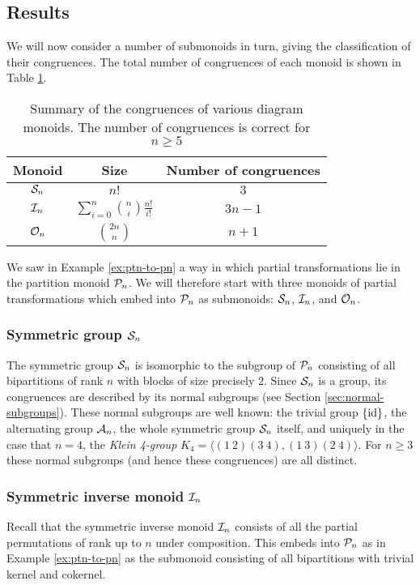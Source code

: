 \subsection{Results}
\label{sec:other-monoids-results}
We will now consider a number of submonoids in turn, giving the classification
of their congruences.  The total number of congruences of each monoid is shown
in Table \ref{tab:other-monoids}.

\begin{table}[h]
  \centering
  \renewcommand\arraystretch{1.5}
  \begin{tabular}{| c | c | c |}
    \hline
    Monoid & Size & Number of congruences \\
    \hline
    $\mathcal{S}_n$ & $n!$ & $3$ \\
    $\mathcal{I}_n$ & $\sum_{i=0}^n \binom{n}{i} \frac{n!}{i!}$ & $3n - 1$ \\
    $\mathcal{O}_n$ & $\binom{2n}{n}$ & $n + 1$ \\
    \hline
  \end{tabular}
  \caption{Summary of the congruences of various diagram monoids.  The number of
  congruences is correct for $n \geq 5$}
  \label{tab:other-monoids}
\end{table}

We saw in Example \ref{ex:ptn-to-pn} a way in which partial transformations lie
in the partition monoid $\mathcal{P}_n$.  We will therefore start with three monoids of
partial transformations which embed into $\mathcal{P}_n$ as submonoids: $\mathcal{S}_n$,
$\mathcal{I}_n$, and $\mathcal{O}_n$.

\subsubsection{Symmetric group $\mathcal{S}_n$}
The symmetric group $\mathcal{S}_n$ is isomorphic to the subgroup of $\mathcal{P}_n$
consisting of all bipartitions of rank $n$ with blocks of size precisely $2$.
Since $\mathcal{S}_n$ is a group, its congruences are described by its normal subgroups
(see Section \ref{sec:normal-subgroups}).  These normal subgroups are well
known: the trivial group $\{\operatorname{id}\}$, the alternating group $\mathcal{A}_n$, the whole
symmetric group $\mathcal{S}_n$ itself, and uniquely in the case that $n=4$, the
\textit{Klein 4-group} $K_4 = \langle (1~2)(3~4), (1~3)(2~4) \rangle$.  For
$n \geq 3$ these normal subgroups (and hence these congruences) are all
distinct.

\subsubsection{Symmetric inverse monoid $\mathcal{I}_n$}
Recall that the symmetric inverse monoid $\mathcal{I}_n$ consists of all the partial
permutations of rank up to $n$ under composition.  This embeds into $\mathcal{P}_n$ as
in Example \ref{ex:ptn-to-pn} as the submonoid consisting of all bipartitions
with trivial kernel and cokernel.

